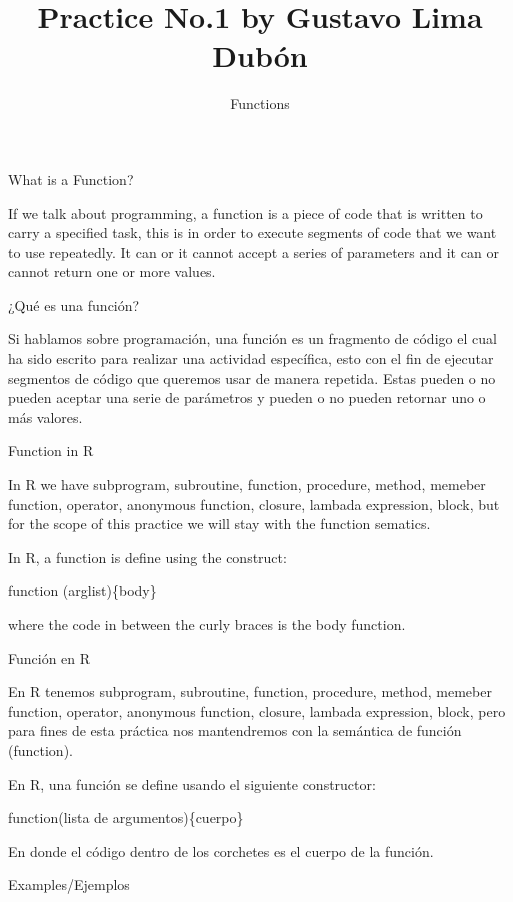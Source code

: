 \documentclass[
]{article}
\title{Practice No.1 by Gustavo Lima Dubón}
\subtitle{Functions}
\author{}
\date{\vspace{-2.5em}}
\begin{document}
\maketitle

What is a Function?

If we talk about programming, a function is a piece of code that is
written to carry a specified task, this is in order to execute segments
of code that we want to use repeatedly. It can or it cannot accept a
series of parameters and it can or cannot return one or more values.

¿Qué es una función?

Si hablamos sobre programación, una función es un fragmento de código el
cual ha sido escrito para realizar una actividad específica, esto con el
fin de ejecutar segmentos de código que queremos usar de manera
repetida. Estas pueden o no pueden aceptar una serie de parámetros y
pueden o no pueden retornar uno o más valores.

Function in R

In R we have subprogram, subroutine, function, procedure, method,
memeber function, operator, anonymous function, closure, lambada
expression, block, but for the scope of this practice we will stay with
the function sematics.

In R, a function is define using the construct:

function (arglist)\{body\}

where the code in between the curly braces is the body function.

Función en R

En R tenemos subprogram, subroutine, function, procedure, method,
memeber function, operator, anonymous function, closure, lambada
expression, block, pero para fines de esta práctica nos mantendremos con
la semántica de función (function).

En R, una función se define usando el siguiente constructor:

function(lista de argumentos)\{cuerpo\}

En donde el código dentro de los corchetes es el cuerpo de la función.

Examples/Ejemplos
\end{document}
